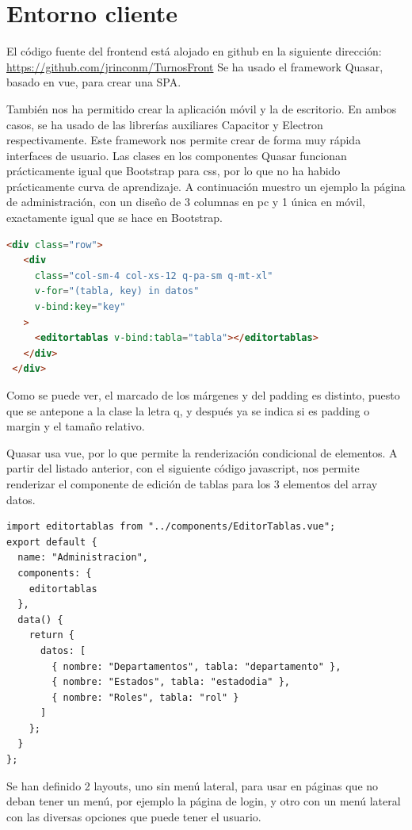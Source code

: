 \documentclass[11pt,spanish,listoffigures,listoftables]{tfgetsinf}
\begin{document}
\section{Entorno cliente}
El código fuente del frontend está alojado en github en la siguiente dirección: \url{https://github.com/jrinconm/TurnosFront}
Se ha usado el framework Quasar, basado en vue, para crear una SPA. 

También nos ha permitido crear la aplicación móvil y la de escritorio. En ambos casos, se ha usado de las librerías auxiliares Capacitor y Electron respectivamente.
Este framework nos permite crear de forma muy rápida interfaces de usuario. 
Las clases en los componentes Quasar funcionan prácticamente igual que Bootstrap para css, por lo que no ha habido prácticamente curva de aprendizaje.
A continuación muestro un ejemplo la página de administración, con un diseño de 3 columnas en pc y 1 única en móvil, exactamente igual que se hace en Bootstrap.

\begin{lstlisting}[language=HTML, caption={Template página administración}]
   <div class="row">
   <div
     class="col-sm-4 col-xs-12 q-pa-sm q-mt-xl"
     v-for="(tabla, key) in datos"
     v-bind:key="key"
   >
     <editortablas v-bind:tabla="tabla"></editortablas>
   </div>
 </div>
\end{lstlisting}
Como se puede ver, el marcado de los márgenes y del padding es distinto, puesto que se antepone a la clase la letra q, y después ya se indica si es padding o margin y el tamaño relativo.

Quasar usa vue, por lo que permite la renderización condicional de elementos. A partir del listado anterior, con el siguiente código javascript, nos permite renderizar el componente de edición de tablas para los 3 elementos del array datos.

\begin{lstlisting}[style=ES6, caption={Script página administracón}]
import editortablas from "../components/EditorTablas.vue";
export default {
  name: "Administracion",
  components: {
    editortablas
  },
  data() {
    return {
      datos: [
        { nombre: "Departamentos", tabla: "departamento" },
        { nombre: "Estados", tabla: "estadodia" },
        { nombre: "Roles", tabla: "rol" }
      ]
    };
  }
};
\end{lstlisting}

Se han definido 2 layouts, uno sin menú lateral, para usar en páginas que no deban tener un menú, por ejemplo la página de login, y otro con un menú lateral con las diversas opciones que puede tener el usuario.
\end{document}
